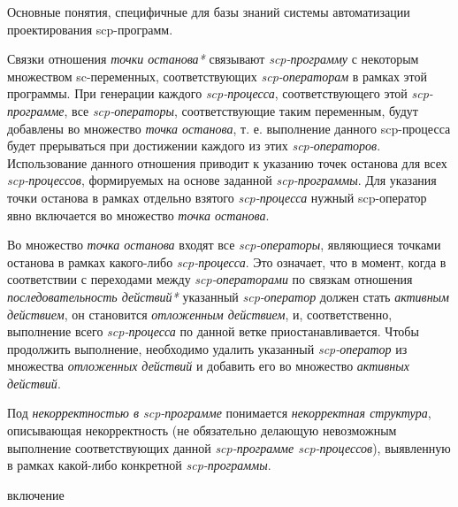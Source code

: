 Основные понятия, специфичные для базы знаний системы автоматизации проектирования scp-программ.
\begin{SCn}
\end{SCn}

Связки отношения \textit{точки останова*} связывают \textit{scp-программу} с некоторым множеством sc-переменных, соответствующих \textit{scp-операторам} в рамках этой программы. При генерации каждого \textit{scp-процесса}, соответствующего этой \textit{scp-программе}, все \textit{scp-операторы}, соответствующие таким переменным, будут добавлены во множество \textit{точка останова}, т. е. выполнение данного scp-процесса будет прерываться при достижении каждого из этих \textit{scp-операторов}.
Использование данного отношения приводит к указанию точек останова для всех \textit{scp-процессов}, формируемых на основе заданной \textit{\mbox{scp-программы}}. Для указания точки останова в рамках отдельно взятого \textit{scp-процесса} нужный scp-оператор явно включается во множество \textit{точка останова}.

\begin{SCn}
\end{SCn}

Во множество \textit{точка останова} входят все \textit{scp-операторы}, являющиеся точками останова в рамках какого-либо \textit{scp-процесса}. Это означает, что в момент, когда в соответствии с переходами между \textit{scp-операторами} по связкам отношения \textit{последовательность действий*} указанный \textit{scp-оператор} должен стать \textit{активным действием}, он становится \textit{отложенным действием}, и, соответственно, выполнение всего \textit{scp-процесса} по данной ветке приостанавливается. Чтобы продолжить выполнение, необходимо удалить указанный \textit{\mbox{scp-оператор}} из множества \textit{отложенных действий} и добавить его во множество \textit{активных действий}.

Под \textit{некорректностью в scp-программе} понимается \textit{некорректная структура}, описывающая некорректность (не обязательно делающую невозможным выполнение соответствующих данной \textit{scp-программе scp-процессов}), выявленную в рамках какой-либо конкретной \textit{scp-программы}.

\begin{SCn}
\begin{scnrelfromlist}{включение}
\end{scnrelfromlist}
\end{SCn}

